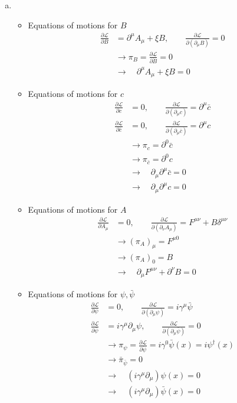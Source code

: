 \documentclass[10pt,a4paper]{report}
\theoremstyle{definition}
\begin{document}
\begin{enumerate}[(a)]
\item 
\begin{itemize}
\item Equations of motions for $B$
\begin{align}
\frac{\partial\mathcal{L}}{\partial B}&=\partial^\mu A_\mu+\xi B,
\qquad\frac{\partial\mathcal{L}}{\partial( \partial_\mu B)}=0\\
&\rightarrow\pi_B=\frac{\partial\mathcal{L}}{\partial \dot B}=0\\
&\rightarrow\quad \partial^\mu A_\mu+\xi B=0
\end{align}

\item Equations of motions for $c$
\begin{align}
\frac{\partial\mathcal{L}}{\partial c}&=0,
\qquad\frac{\partial\mathcal{L}}{\partial(\partial_\mu{c})}=\partial^\mu\bar{c}\\
\frac{\partial\mathcal{L}}{\partial \bar{c}}&=0,
\qquad\frac{\partial\mathcal{L}}{\partial(\partial_\mu{\bar{c}})}=\partial^\mu c\\
&\rightarrow\pi_c=\partial^0\bar{c}\\
&\rightarrow\pi_{\bar{c}}=\partial^0c\\
&\rightarrow\quad\partial_\mu\partial^\mu\bar{c}=0\\
&\rightarrow\quad\partial_\mu\partial^\mu c=0
\end{align}
\item Equations of motions for $A$
\begin{align}
\frac{\partial\mathcal{L}}{\partial A_\mu}&=0,\qquad
\frac{\partial\mathcal{L}}{\partial(\partial_\nu A_\mu)}=F^{\mu\nu}+B\delta^{\mu\nu}\\
&\rightarrow(\pi_{A})_\mu=F^{\mu0}\\
&\rightarrow(\pi_{A})_0=B\\
&\rightarrow\quad\partial_\mu F^{\mu\nu}+\partial^\nu B=0
\end{align}

\item Equations of motions for $\psi, \bar{\psi}$
\begin{align}
\frac{\partial\mathcal{L}}{\partial\psi}&=0,
\qquad\frac{\partial\mathcal{L}}{\partial(\partial_\mu\psi)}=i\gamma^\mu\bar{\psi}\\
\frac{\partial\mathcal{L}}{\partial\bar{\psi}}&=i\gamma^\mu\partial_\mu\psi,
\qquad
\frac{\partial\mathcal{L}}{\partial(\partial_\mu\bar{\psi})}=0\\
&\rightarrow\pi_\psi=\frac{\partial\mathcal{L}}{\partial\dot{\psi}}=i\gamma^0\bar{\psi}(x)=i\psi^\dagger(x)\\
&\rightarrow\bar{\pi}_{\bar{\psi}}=0\\
&\rightarrow\quad(i\gamma^\mu\partial_\mu)\psi(x)=0\\
&\rightarrow\quad(i\gamma^\mu\partial_\mu)\bar{\psi}(x)=0
\end{align}
\end{itemize}


\end{enumerate}
\end{document}
